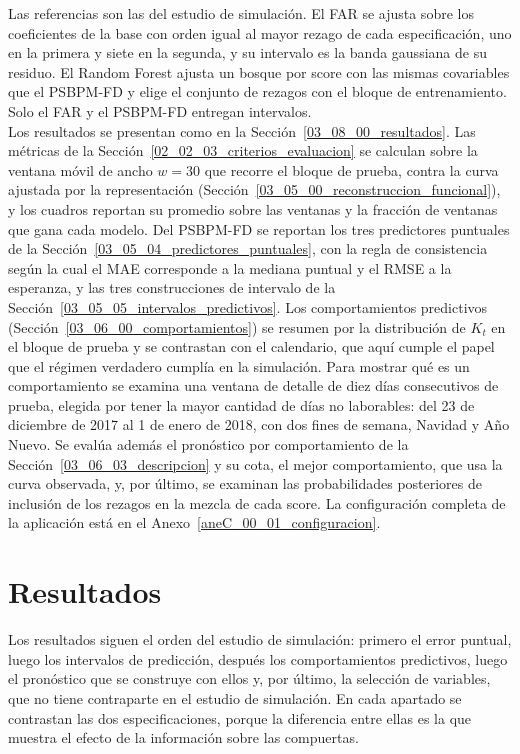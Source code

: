 Las referencias son las del estudio de simulación. El FAR se ajusta sobre los coeficientes de la base con orden igual al mayor rezago de cada especificación, uno en la primera y siete en la segunda, y su intervalo es la banda gaussiana de su residuo. El Random Forest ajusta un bosque por score con las mismas covariables que el PSBPM-FD y elige el conjunto de rezagos con el bloque de entrenamiento. Solo el FAR y el PSBPM-FD entregan intervalos.\\

Los resultados se presentan como en la Sección~\ref{03_08_00_resultados}. Las métricas de la Sección~\ref{02_02_03_criterios_evaluacion} se calculan sobre la ventana móvil de ancho $w = 30$ que recorre el bloque de prueba, contra la curva ajustada por la representación (Sección~\ref{03_05_00_reconstruccion_funcional}), y los cuadros reportan su promedio sobre las ventanas y la fracción de ventanas que gana cada modelo. Del PSBPM-FD se reportan los tres predictores puntuales de la Sección~\ref{03_05_04_predictores_puntuales}, con la regla de consistencia según la cual el MAE corresponde a la mediana puntual y el RMSE a la esperanza, y las tres construcciones de intervalo de la Sección~\ref{03_05_05_intervalos_predictivos}. Los comportamientos predictivos (Sección~\ref{03_06_00_comportamientos}) se resumen por la distribución de $K_t$ en el bloque de prueba y se contrastan con el calendario, que aquí cumple el papel que el régimen verdadero cumplía en la simulación. Para mostrar qué es un comportamiento se examina una ventana de detalle de diez días consecutivos de prueba, elegida por tener la mayor cantidad de días no laborables: del 23 de diciembre de 2017 al 1 de enero de 2018, con dos fines de semana, Navidad y Año Nuevo. Se evalúa además el pronóstico por comportamiento de la Sección~\ref{03_06_03_descripcion} y su cota, el mejor comportamiento, que usa la curva observada, y, por último, se examinan las probabilidades posteriores de inclusión de los rezagos en la mezcla de cada score. La configuración completa de la aplicación está en el Anexo~\ref{aneC_00_01_configuracion}.

\section{Resultados}
\label{04_03_00_resultados}

Los resultados siguen el orden del estudio de simulación: primero el error puntual, luego los intervalos de predicción, después los comportamientos predictivos, luego el pronóstico que se construye con ellos y, por último, la selección de variables, que no tiene contraparte en el estudio de simulación. En cada apartado se contrastan las dos especificaciones, porque la diferencia entre ellas es la que muestra el efecto de la información sobre las compuertas.

